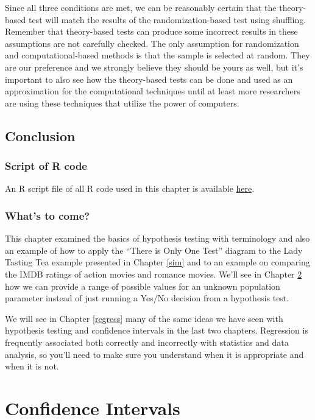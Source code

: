 \documentclass[]{tufte-book}
\begin{document}
Since all three conditions are met, we can be reasonably certain that
the theory-based test will match the results of the randomization-based
test using shuffling. Remember that theory-based tests can produce some
incorrect results in these assumptions are not carefully checked. The
only assumption for randomization and computational-based methods is
that the sample is selected at random. They are our preference and we
strongly believe they should be yours as well, but it's important to
also see how the theory-based tests can be done and used as an
approximation for the computational techniques until at least more
researchers are using these techniques that utilize the power of
computers.

\section{Conclusion}\label{conclusion-3}

\subsection{Script of R code}\label{script-of-r-code-3}

An R script file of all R code used in this chapter is available
\href{http://ismayc.github.io/moderndiver-book/scripts/07-hypo.R}{here}.

\subsection{What's to come?}\label{whats-to-come-4}

This chapter examined the basics of hypothesis testing with terminology
and also an example of how to apply the ``There is Only One Test''
diagram to the Lady Tasting Tea example presented in Chapter \ref{sim}
and to an example on comparing the IMDB ratings of action movies and
romance movies. We'll see in Chapter \ref{ci} how we can provide a range
of possible values for an unknown population parameter instead of just
running a Yes/No decision from a hypothesis test.

We will see in Chapter \ref{regress} many of the same ideas we have seen
with hypothesis testing and confidence intervals in the last two
chapters. Regression is frequently associated both correctly and
incorrectly with statistics and data analysis, so you'll need to make
sure you understand when it is appropriate and when it is not.

\chapter{Confidence Intervals}\label{ci}
\end{document}
